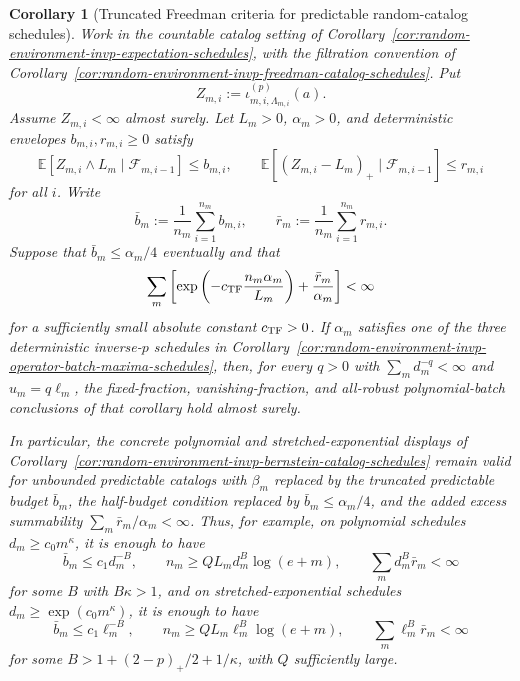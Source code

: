 \documentclass[11pt]{amsart}
\numberwithin{equation}{section}
\newtheorem{corollary}[theorem]{Corollary}
\theoremstyle{definition}
\theoremstyle{remark}
\newcommand{\Exp}{\mathbb E}
\begin{document}
\begin{corollary}[Truncated Freedman criteria for predictable random-catalog schedules]
\label{cor:random-environment-invp-truncated-freedman-catalog-schedules}
Work in the countable catalog setting of
Corollary~\ref{cor:random-environment-invp-expectation-schedules}, with the
filtration convention of
Corollary~\ref{cor:random-environment-invp-freedman-catalog-schedules}.  Put
\[
  Z_{m,i}:=\iota_{m,i,\Lambda_{m,i}}^{(p)}(a).
\]
Assume \(Z_{m,i}<\infty\) almost surely.  Let \(L_m>0\), \(\alpha_m>0\), and
deterministic envelopes \(b_{m,i},r_{m,i}\ge0\) satisfy
\[
  \Exp[Z_{m,i}\wedge L_m\mid\mathcal F_{m,i-1}]\le b_{m,i},
  \qquad
  \Exp[(Z_{m,i}-L_m)_+\mid\mathcal F_{m,i-1}]\le r_{m,i}
\]
for all \(i\).  Write
\[
  \bar b_m:=\frac1{n_m}\sum_{i=1}^{n_m}b_{m,i},
  \qquad
  \bar r_m:=\frac1{n_m}\sum_{i=1}^{n_m}r_{m,i}.
\]
Suppose that \(\bar b_m\le\alpha_m/4\) eventually and that
\[
  \sum_m
  \left[
    \exp\left(-c_{\rm TF}\frac{n_m\alpha_m}{L_m}\right)
    +\frac{\bar r_m}{\alpha_m}
  \right]<\infty
\]
for a sufficiently small absolute constant \(c_{\rm TF}>0\).  If
\(\alpha_m\) satisfies one of the three deterministic inverse-\(p\) schedules in
Corollary~\ref{cor:random-environment-invp-operator-batch-maxima-schedules},
then, for every \(q>0\) with \(\sum_m d_m^{-q}<\infty\) and \(u_m=q\ell_m\),
the fixed-fraction, vanishing-fraction, and all-robust polynomial-batch
conclusions of that corollary hold almost surely.

In particular, the concrete polynomial and stretched-exponential displays of
Corollary~\ref{cor:random-environment-invp-bernstein-catalog-schedules} remain
valid for unbounded predictable catalogs with \(\beta_m\) replaced by the
truncated predictable budget \(\bar b_m\), the half-budget condition replaced by
\(\bar b_m\le\alpha_m/4\), and the added excess summability
\(\sum_m\bar r_m/\alpha_m<\infty\).  Thus, for example, on polynomial schedules
\(d_m\ge c_0m^\kappa\), it is enough to have
\[
  \bar b_m\le c_1d_m^{-B},\qquad
  n_m\ge QL_md_m^B\log(e+m),\qquad
  \sum_m d_m^B\bar r_m<\infty
\]
for some \(B\) with \(B\kappa>1\), and on stretched-exponential schedules
\(d_m\ge\exp(c_0m^\kappa)\), it is enough to have
\[
  \bar b_m\le c_1\ell_m^{-B},\qquad
  n_m\ge QL_m\ell_m^B\log(e+m),\qquad
  \sum_m \ell_m^B\bar r_m<\infty
\]
for some \(B>1+(2-p)_+/2+1/\kappa\), with \(Q\) sufficiently large.
\end{corollary}
\end{document}
